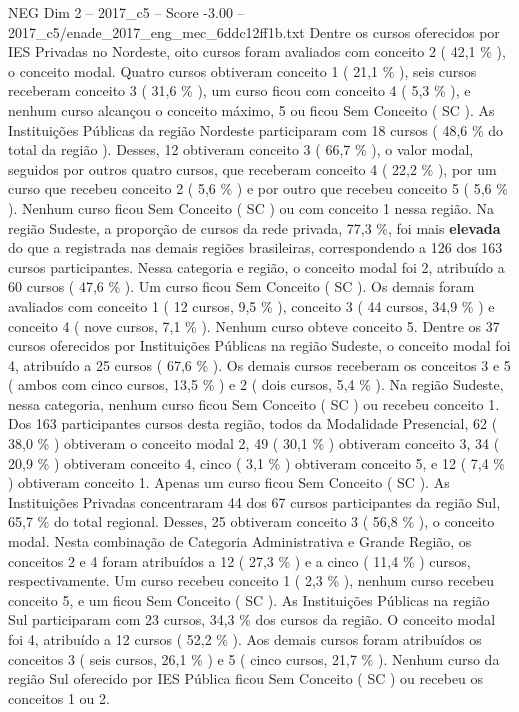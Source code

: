 \begin{textsample}{NEG Dim 2 – 2017\_c5 – Score -3.00 – 2017\_c5/enade\_2017\_eng\_mec\_6ddc12ff1b.txt}
Dentre os cursos oferecidos por IES Privadas no Nordeste, oito cursos foram avaliados com conceito 2 ( 42,1 \% ), o conceito modal.
Quatro cursos obtiveram conceito 1 ( 21,1 \% ), seis cursos receberam conceito 3 ( 31,6 \% ), um curso ficou com conceito 4 ( 5,3 \% ), e nenhum curso alcançou o conceito máximo, 5 ou ficou Sem Conceito ( SC ).
As Instituições Públicas da região Nordeste participaram com 18 cursos ( 48,6 \% do total da região ).
Desses, 12 obtiveram conceito 3 ( 66,7 \% ), o valor modal, seguidos por outros quatro cursos, que receberam conceito 4 ( 22,2 \% ), por um curso que recebeu conceito 2 ( 5,6 \% ) e por outro que recebeu conceito 5 ( 5,6 \% ).
Nenhum curso ficou Sem Conceito ( SC ) ou com conceito 1 nessa região.
Na região Sudeste, a proporção de cursos da rede privada, 77,3 \%, foi mais \textbf{elevada} do que a registrada nas demais regiões brasileiras, correspondendo a 126 dos 163 cursos participantes.
Nessa categoria e região, o conceito modal foi 2, atribuído a 60 cursos ( 47,6 \% ).
Um curso ficou Sem Conceito ( SC ).
Os demais foram avaliados com conceito 1 ( 12 cursos, 9,5 \% ), conceito 3 ( 44 cursos, 34,9 \% ) e conceito 4 ( nove cursos, 7,1 \% ).
Nenhum curso obteve conceito 5.
Dentre os 37 cursos oferecidos por Instituições Públicas na região Sudeste, o conceito modal foi 4, atribuído a 25 cursos ( 67,6 \% ).
Os demais cursos receberam os conceitos 3 e 5 ( ambos com cinco cursos, 13,5 \% ) e 2 ( dois cursos, 5,4 \% ).
Na região Sudeste, nessa categoria, nenhum curso ficou Sem Conceito ( SC ) ou recebeu conceito 1.
Dos 163 participantes cursos desta região, todos da Modalidade Presencial, 62 ( 38,0 \% ) obtiveram o conceito modal 2, 49 ( 30,1 \% ) obtiveram conceito 3, 34 ( 20,9 \% ) obtiveram conceito 4, cinco ( 3,1 \% ) obtiveram conceito 5, e 12 ( 7,4 \% ) obtiveram conceito 1.
Apenas um curso ficou Sem Conceito ( SC ).
As Instituições Privadas concentraram 44 dos 67 cursos participantes da região Sul, 65,7 \% do total regional.
Desses, 25 obtiveram conceito 3 ( 56,8 \% ), o conceito modal.
Nesta combinação de Categoria Administrativa e Grande Região, os conceitos 2 e 4 foram atribuídos a 12 ( 27,3 \% ) e a cinco ( 11,4 \% ) cursos, respectivamente.
Um curso recebeu conceito 1 ( 2,3 \% ), nenhum curso recebeu conceito 5, e um ficou Sem Conceito ( SC ).
As Instituições Públicas na região Sul participaram com 23 cursos, 34,3 \% dos cursos da região.
O conceito modal foi 4, atribuído a 12 cursos ( 52,2 \% ).
Aos demais cursos foram atribuídos os conceitos 3 ( seis cursos, 26,1 \% ) e 5 ( cinco cursos, 21,7 \% ).
Nenhum curso da região Sul oferecido por IES Pública ficou Sem Conceito ( SC ) ou recebeu os conceitos 1 ou 2.

\end{textsample}
